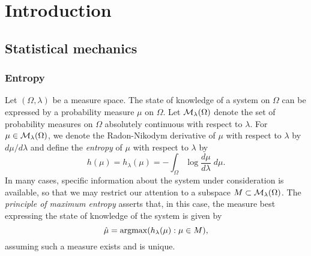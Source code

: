 
\chapter{Introduction}


\section{Statistical mechanics}



\subsection{Entropy}

Let $(\Omega, \lambda)$ be a measure space. The state of knowledge of a system on
$\Omega$ can be expressed by a probability measure $\mu$ on $\Omega$. Let
$\mathcal{M}_\lambda(\Omega)$ denote the set of probability measures on $\Omega$ absolutely
continuous with respect to $\lambda$. For
$\mu \in \mathcal{M}_\lambda(\Omega)$, we denote the Radon-Nikodym derivative of
$\mu$ with respect to $\lambda$ by $d\mu/d\lambda$ and define the
\emph{entropy} of $\mu$ with respect to $\lambda$ by
\begin{equation}
h(\mu) = h_\lambda(\mu) = -\int_\Omega \log\frac{d\mu}{d\lambda} \; d\mu.
\end{equation}
In many cases, specific information about the system under consideration is available,
so that we may restrict our attention to a subspace $M \subset \mathcal{M}_\lambda(\Omega)$.
The \emph{principle of maximum entropy} \cite{Jaynes57} asserts that, in this
case, the measure best expressing the state of knowledge of the system is given by
\begin{equation}
\hat\mu = \operatorname*{argmax}(h_\lambda(\mu) : \mu \in M),
\end{equation}
assuming such a measure exists and is unique.

